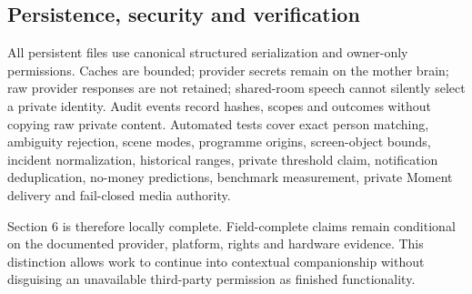 \subsection{Persistence, security and verification}

All persistent files use canonical structured serialization and owner-only permissions.
Caches are bounded; provider secrets remain on the mother brain; raw provider responses
are not retained; shared-room speech cannot silently select a private identity.  Audit
events record hashes, scopes and outcomes without copying raw private content.  Automated
tests cover exact person matching, ambiguity rejection, scene modes, programme origins,
screen-object bounds, incident normalization, historical ranges, private threshold claim,
notification deduplication, no-money predictions, benchmark measurement, private Moment
delivery and fail-closed media authority.

Section 6 is therefore locally complete.  Field-complete claims remain conditional on the
documented provider, platform, rights and hardware evidence.  This distinction allows work
to continue into contextual companionship without disguising an unavailable third-party
permission as finished functionality.
